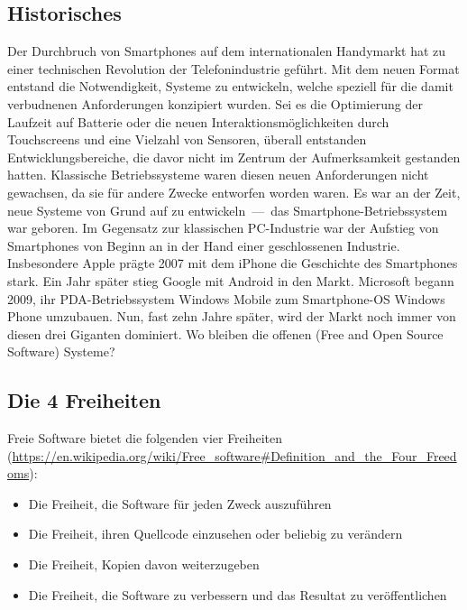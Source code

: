 \subsection{Historisches}
Der Durchbruch von Smartphones auf dem internationalen Handymarkt hat zu einer technischen Revolution der Telefonindustrie geführt. Mit dem neuen Format entstand die Notwendigkeit, Systeme zu entwickeln, welche speziell für die damit verbudnenen Anforderungen konzipiert wurden. Sei es die Optimierung der Laufzeit auf Batterie oder die neuen Interaktionsmöglichkeiten durch Touchscreens und eine Vielzahl von Sensoren, überall entstanden Entwicklungsbereiche, die davor nicht im Zentrum der Aufmerksamkeit gestanden hatten. Klassische Betriebssysteme waren diesen neuen Anforderungen nicht gewachsen, da sie für andere Zwecke entworfen worden waren. Es war an der Zeit, neue Systeme von Grund auf zu \mbox{entwickeln --- das} \mbox{Smartphone-Betriebssystem} war geboren.
Im Gegensatz zur klassischen \mbox{PC-Industrie} war der Aufstieg von Smartphones von Beginn an in der Hand einer geschlossenen Industrie. Insbesondere Apple prägte 2007 mit dem iPhone die Geschichte des Smartphones stark. Ein Jahr später stieg Google mit Android in den Markt. Microsoft begann 2009, ihr \mbox{PDA-Betriebssystem} Windows Mobile zum \mbox{Smartphone-OS} Windows Phone umzubauen. Nun, fast zehn Jahre später, wird der Markt noch immer von diesen drei Giganten dominiert. Wo bleiben die offenen (Free and Open Source Software) Systeme?\\

\subsection{Die 4 Freiheiten}
Freie Software bietet die folgenden vier Freiheiten (\url{https://en.wikipedia.org/wiki/Free_software#Definition_and_the_Four_Freedoms}):
\begin{itemize}
	\renewcommand\labelitemi{--}
	\item Die Freiheit, die Software für jeden Zweck auszuführen
	\item  Die Freiheit, ihren Quellcode einzusehen oder beliebig zu verändern
	\item Die Freiheit, Kopien davon weiterzugeben
	\item Die Freiheit, die Software zu verbessern und das Resultat zu veröffentlichen
\end{itemize}

\medskip
